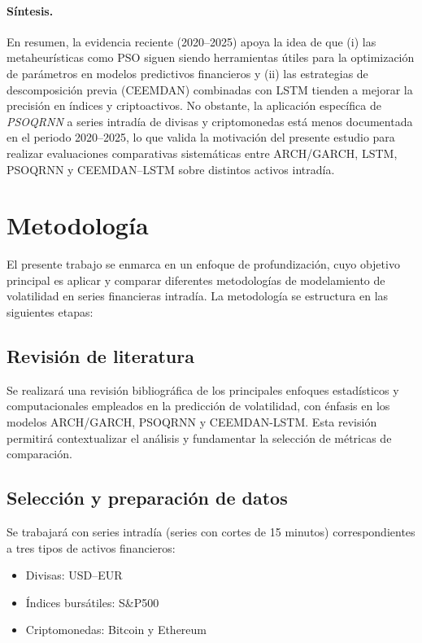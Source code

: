 \documentclass[12pt]{paper}
\begin{document}
\paragraph{Síntesis.}
En resumen, la evidencia reciente (2020--2025) apoya la idea de que (i) las metaheurísticas como PSO siguen siendo herramientas útiles para la optimización de parámetros en modelos predictivos financieros y (ii) las estrategias de descomposición previa (CEEMDAN) combinadas con LSTM tienden a mejorar la precisión en índices y criptoactivos. No obstante, la aplicación específica de \emph{PSOQRNN} a series intradía de divisas y criptomonedas está menos documentada en el periodo 2020--2025, lo que valida la motivación del presente estudio para realizar evaluaciones comparativas sistemáticas entre ARCH/GARCH, LSTM, PSOQRNN y CEEMDAN--LSTM sobre distintos activos intradía.

\section[Metodología]{Metodología}

El presente trabajo se enmarca en un enfoque de profundización, cuyo objetivo principal es aplicar y comparar diferentes metodologías de modelamiento de volatilidad en series financieras intradía. La metodología se estructura en las siguientes etapas:

\subsection{Revisión de literatura}
Se realizará una revisión bibliográfica de los principales enfoques estadísticos y computacionales empleados en la predicción de volatilidad, con énfasis en los modelos ARCH/GARCH, PSOQRNN y CEEMDAN-LSTM. Esta revisión permitirá contextualizar el análisis y fundamentar la selección de métricas de comparación.

\subsection{Selección y preparación de datos}
Se trabajará con series intradía (series con cortes de 15 minutos) correspondientes a tres tipos de activos financieros:
\begin{itemize}
    \item Divisas: USD--EUR
    \item Índices bursátiles: S\&P500
    \item Criptomonedas: Bitcoin y Ethereum
\end{itemize}
\end{document}
